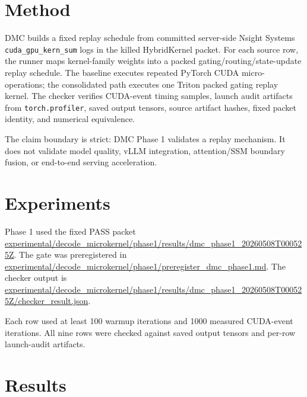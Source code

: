 \documentclass{article}
\begin{document}
\section{Method}

DMC builds a fixed replay schedule from committed server-side Nsight Systems
\texttt{cuda\_gpu\_kern\_sum} logs in the killed HybridKernel packet. For each
source row, the runner maps kernel-family weights into a packed
gating/routing/state-update replay schedule. The baseline executes repeated
PyTorch CUDA micro-operations; the consolidated path executes one Triton packed
gating replay kernel. The checker verifies CUDA-event timing samples, launch
audit artifacts from \texttt{torch.profiler}, saved output tensors, source
artifact hashes, fixed packet identity, and numerical equivalence.

The claim boundary is strict: DMC Phase 1 validates a replay mechanism. It does
not validate model quality, vLLM integration, attention/SSM boundary fusion, or
end-to-end serving acceleration.

\section{Experiments}
\label{sec:experiments}

Phase 1 used the fixed PASS packet
\url{experimental/decode_microkernel/phase1/results/dmc_phase1_20260508T000525Z}.
The gate was preregistered in
\url{experimental/decode_microkernel/phase1/preregister_dmc_phase1.md}. The
checker output is
\url{experimental/decode_microkernel/phase1/results/dmc_phase1_20260508T000525Z/checker_result.json}.

Each row used at least 100 warmup iterations and 1000 measured CUDA-event
iterations. All nine rows were checked against saved output tensors and
per-row launch-audit artifacts.

\section{Results}
\end{document}

